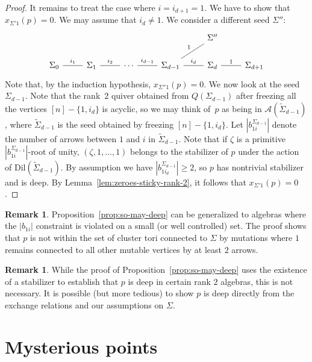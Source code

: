 \documentclass{amsart}
\newcommand{\seed}{\Sigma}
\newcommand{\var}{\mathcal{A}}
\numberwithin{equation}{section}
\theoremstyle{definition}
\newtheorem{remark}[theorem]{Remark}
\newcommand{\dil}{\mathrm{Dil}}
\begin{document}
\begin{proof}
It remains to treat the case where $i=i_{d+1} = 1$. We have to show that $x_{\seed' 1}(p) = 0$. We may assume that $i_{d} \neq 1$. We consider a different seed $\seed''$:
\[\begin{tikzcd}
	&&&& {\seed''} & \\
	{\seed_0} & {\seed_1} & \cdots & {\seed_{d-1}} & {\seed_{d}} & {\seed_{d+1}}
	\arrow["{i_1}", no head, from=2-1, to=2-2]
	\arrow["{i_2}", no head, from=2-2, to=2-3]
	\arrow["{i_{d-1}}", no head, from=2-3, to=2-4]
	\arrow["1", no head, from=2-4, to=1-5]
	\arrow["{i_{d}}", no head, from=2-4, to=2-5]
	\arrow["1", no head, from=2-5, to=2-6]
\end{tikzcd}\]
Note that, by the induction hypothesis, $x_{\seed''1}(p) = 0$. 
We now look at the seed $\seed_{d-1}$. 
Note that the rank~$2$ quiver obtained from $Q(\seed_{d-1})$ after freezing all the vertices $[n] - \{1,i_d\}$ is acyclic,  so we may think of~$p$ as being in $\var(\widetilde{\seed}_{d-1})$, where $\widetilde{\seed}_{d-1}$ is the seed obtained by freezing $[n] - \{1,i_d\}$. 
Let $|b_{1i}^{\seed_{d-1}}|$ denote the number of arrows between $1$ and $i$ in $\widetilde{\seed}_{d-1}$. 
Note that if $\zeta$ is a primitive $|b_{1i}^{\seed_{d-1}}|$-root of unity, $(\zeta, 1, \ldots, 1)$ belongs to the stabilizer of $p$ under the action of $\dil(\widetilde{\seed}_{d-1})$. By assumption we have $|b_{1i_d}^{\seed_{d-1}}| \geq 2$, so $p$ has nontrivial stabilizer and is deep.
By Lemma~\ref{lem:zeroes-sticky-rank-2}, it follows that $x_{\seed'1}(p) = 0$.
\end{proof}

\begin{remark}
Proposition~\ref{prop:so-may-deep} can be generalized to algebras where the $|b_{1i}|$ constraint is violated on a small (or well controlled) set. 
The proof shows that $p$ is not within the set of cluster tori connected to $\seed$ by mutations where $1$ remains connected to all other mutable vertices by at least $2$ arrows. 
\end{remark}

\begin{remark}
While the proof of Proposition~\ref{prop:so-may-deep} uses the existence of a stabilizer to establish that $p$ is deep in certain rank $2$ algebras, this is not necessary. 
It is possible (but more tedious) to show $p$ is deep directly from the exchange relations and our assumptions on $\seed$. 
\end{remark}



\section{Mysterious points}\label{sec:mysterious-points}
\end{document}
